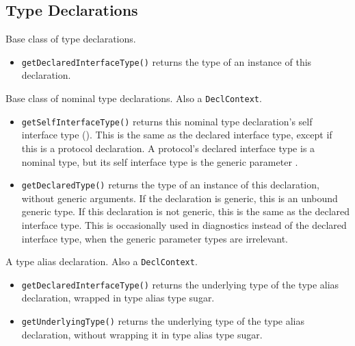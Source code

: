 \documentclass[../generics]{subfiles}
\begin{document}
\subsection*{Type Declarations}

Base class of type declarations.
\begin{itemize}
\item \texttt{getDeclaredInterfaceType()} returns the type of an instance of this declaration.
\end{itemize}

Base class of nominal type declarations. Also a \texttt{DeclContext}.
\begin{itemize}
\item \texttt{getSelfInterfaceType()} returns this nominal type declaration's self interface type (). This is the same as the declared interface type, except if this is a protocol declaration. A protocol's declared interface type is a nominal type, but its self interface type is the generic parameter \tSelf.
\item \texttt{getDeclaredType()} returns the type of an instance of this declaration, without generic arguments. If the declaration is generic, this is an unbound generic type. If this declaration is not generic, this is the same as the declared interface type. This is occasionally used in diagnostics instead of the declared interface type, when the generic parameter types are irrelevant.
\end{itemize}

A type alias declaration. Also a \texttt{DeclContext}.
\begin{itemize}
\item \texttt{getDeclaredInterfaceType()} returns the underlying type of the type alias declaration, wrapped in type alias type sugar.
\item \texttt{getUnderlyingType()} returns the underlying type of the type alias declaration, without wrapping it in type alias type sugar.
\end{itemize}
\end{document}
